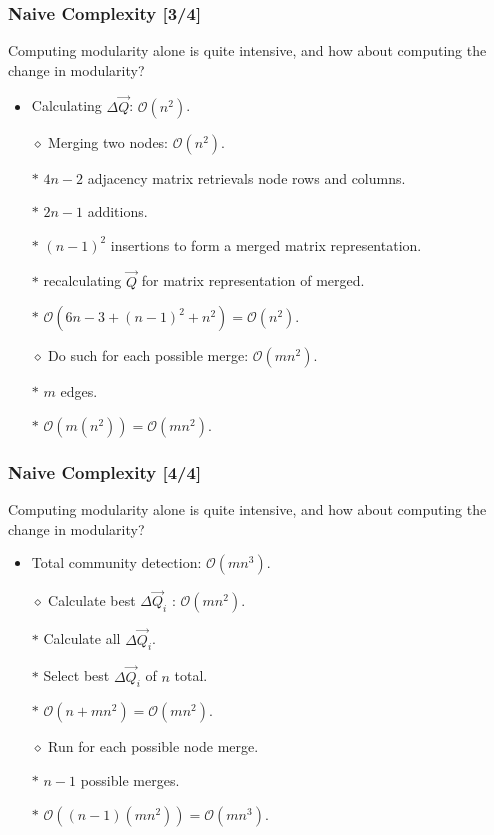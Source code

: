 \documentclass{beamer}
\begin{document}
\begin{frame}

    \frametitle{Naive Complexity [3/4]}

    Computing modularity alone is quite intensive, and how about computing the change in modularity?\pause

    \vspace{2.5mm}
    \begin{itemize}
        \item Calculating $ \Delta \vec{Q} $: $ \mathcal{O}(n^{2}) $.\pause
        \item[$\diamond$] Merging two nodes: $ \mathcal{O}(n^{2}) $.\pause
        \item[$\ast$] $ 4n - 2 $ adjacency matrix retrievals node rows and columns.\pause
        \item[$\ast$] $ 2n - 1 $ additions.\pause
        \item[$\ast$] $ (n - 1)^{2} $ insertions to form a merged matrix representation.\pause
        \item[$\ast$] recalculating $ \vec{Q} $ for matrix representation of merged.\pause
        \item[$\ast$] $ \mathcal{O}(6n -3 + (n - 1)^{2} + n^{2}) = \mathcal{O}(n^{2}) $.\pause
        \item[$\diamond$] Do such for each possible merge: $ \mathcal{O}(mn^{2}) $.\pause
        \item[$\ast$] $ m $ edges.\pause
        \item[$\ast$] $ \mathcal{O}(m(n^{2})) = \mathcal{O}(mn^{2}) $. 
    \end{itemize}

\end{frame}

\begin{frame}

    \frametitle{Naive Complexity [4/4]}

    Computing modularity alone is quite intensive, and how about computing the change in modularity?\pause

    \vspace{2.5mm}
    \begin{itemize}
        \item Total community detection: $ \mathcal{O}(mn^{3}) $.\pause
        \item[$\diamond$] Calculate best $ \Delta \vec{Q}_{i} $ : $\mathcal{O}(mn^{2}) $.\pause
        \item[$\ast$] Calculate all $ \Delta \vec{Q}_{i} $.\pause
        \item[$\ast$] Select best $ \Delta \vec{Q}_{i} $ of $ n $ total.\pause
        \item[$\ast$] $ \mathcal{O}(n + mn^{2}) = \mathcal{O}(mn^{2}) $.\pause
        \item[$\diamond$] Run for each possible node merge.\pause
        \item[$\ast$] $ n - 1 $ possible merges.\pause
        \item[$\ast$] $ \mathcal{O}((n - 1)(mn^{2})) = \mathcal{O}(mn^{3}) $. 
    \end{itemize}

\end{frame}
\end{document}
